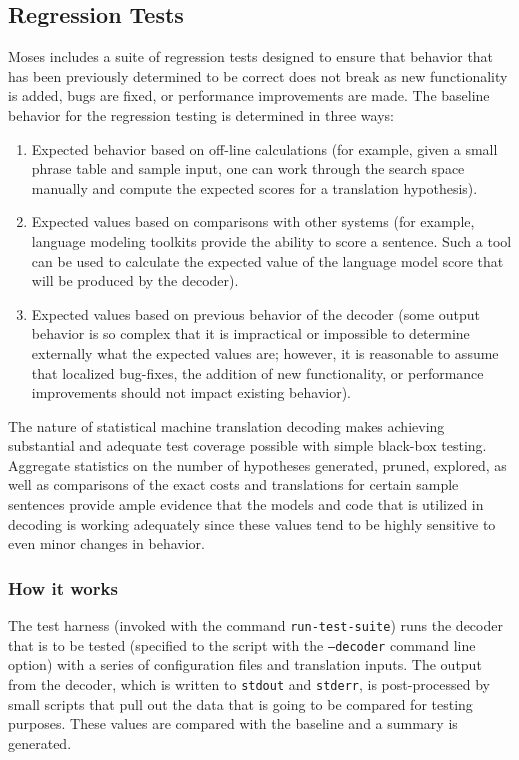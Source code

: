 \documentclass[11pt]{report}
\theoremstyle{plain}
\begin{document}
{\subsection{Regression Tests}
Moses includes a suite of regression tests designed to ensure that
behavior that has been previously determined to be correct does not
break as new functionality is added, bugs are fixed, or performance
improvements are made. The baseline behavior for the regression
testing is determined in three ways:
\begin{enumerate}
  \item Expected behavior based on off-line calculations (for example,
  given a small phrase table and sample input, one can work through
  the search space manually and compute the expected scores for a translation hypothesis).
  \item Expected values based on comparisons with other systems (for
  example, language modeling toolkits provide the ability to score
  a sentence.  Such a tool can be used to calculate the expected value of
  the language model score that will be produced by the decoder).
  \item Expected values based on previous behavior of the decoder (some output behavior
  is so complex that it is impractical or impossible to determine externally
  what the expected values are; however, it is reasonable to assume that localized bug-fixes,
  the addition of new functionality, or performance improvements should not impact existing
  behavior).
\end{enumerate}
The nature of statistical machine translation decoding makes
achieving substantial and adequate test coverage possible with
simple black-box testing.  Aggregate statistics on the number of
hypotheses generated, pruned, explored, as well as comparisons of
the exact costs and translations for certain sample sentences
provide ample evidence that the models and code that is utilized in
decoding is working adequately since these values tend to be highly
sensitive to even minor changes in behavior.

\subsubsection{How it works}
The test harness (invoked with the command \texttt{run-test-suite})
runs the decoder that is to be tested (specified to the script with
the \texttt{--decoder} command line option) with a series of
configuration files and translation inputs.  The output from the
decoder, which is written to \texttt{stdout} and \texttt{stderr}, is
post-processed by small scripts that pull out the data that is going
to be compared for testing purposes.  These values are compared with
the baseline and a summary is generated.

}
\end{document}
